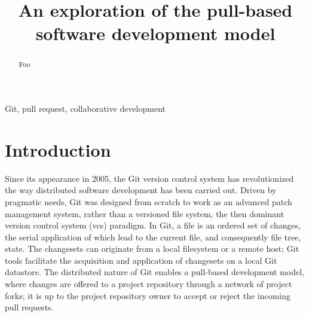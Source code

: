 \documentclass[conference]{IEEEtran}
\begin{document}
\newcommand{\todo}[1]{\textbf{TODO}\footnote{\textbf{TODO:} #1}}

\title{An exploration of the pull-based software development model}

\author{
}

\maketitle

\begin{abstract}
Foo
\end{abstract}

\begin{IEEEkeywords}
Git, pull request, collaborative development
\end{IEEEkeywords}

\section{Introduction}

Since its appearance in 2005, the Git version control system has revolutionized
the way distributed software development has been carried out. Driven by
pragmatic needs, Git was designed from scratch to work as an advanced patch
management system, rather than a versioned file system, the then dominant
version control system ({\sc vcs}) paradigm. In Git, a file is an ordered set of
changes, the serial application of which lead to the current file, and
consequently file tree, state. The changesets can originate from a local
filesystem or a remote host; Git tools facilitate the acquisition and
application of changesets on a local Git datastore. The distributed nature
of Git enables a pull-based development model, where changes are offered
to a project repository through a network of project forks; it is up to the
project repository owner to accept or reject the incoming pull requests.
\end{document}

